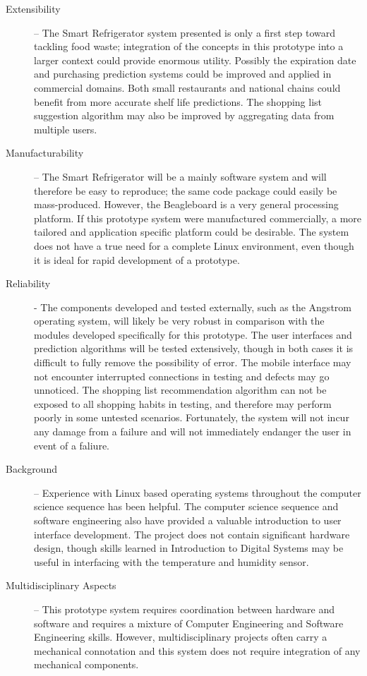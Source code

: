 \documentclass[11pt]{article} %
\begin{document}
\begin{description}
\item[Extensibility] -- The Smart Refrigerator system presented is only a first step toward tackling food waste; integration of the concepts in this prototype into a larger context could provide enormous utility. Possibly the expiration date and purchasing prediction systems could be improved and applied in commercial domains. Both small restaurants and national chains could benefit from more accurate shelf life predictions. The shopping list suggestion algorithm may also be improved by aggregating data from multiple users.
\item[Manufacturability] -- The Smart Refrigerator will be a mainly software system and will therefore be easy to reproduce; the same code package could easily be mass-produced. However, the Beagleboard is a very general processing platform. If this prototype system were manufactured commercially, a more tailored and application specific platform could be desirable. The system does not have a true need for a  complete Linux environment, even though it is ideal for rapid development of a prototype.
\item[Reliability] - The components developed and tested externally, such as the Angstrom operating system, will likely be very robust in comparison with the modules developed specifically for this prototype. The user interfaces and prediction algorithms will be tested extensively, though in both cases it is difficult to fully remove the possibility of error. The mobile interface may not encounter interrupted connections in testing and defects may go unnoticed. The shopping list recommendation algorithm can not be exposed to all shopping habits in testing, and therefore may perform poorly in some untested scenarios. Fortunately, the system will not incur any damage from a failure and will not immediately endanger the user in event of a faliure.
\item[Background] -- Experience with Linux based operating systems throughout the computer science sequence has been helpful. The computer science sequence and software engineering also have provided a valuable introduction to user interface development. The project does not contain significant hardware design, though skills learned in Introduction to Digital Systems may be useful in interfacing with the temperature and humidity sensor.
\item[Multidisciplinary Aspects] -- This prototype system requires coordination between hardware and software and requires a mixture of Computer Engineering and Software Engineering skills. However, multidisciplinary projects often carry a mechanical connotation and this system does not require integration of any mechanical components.
\end{description}
\end{document}
